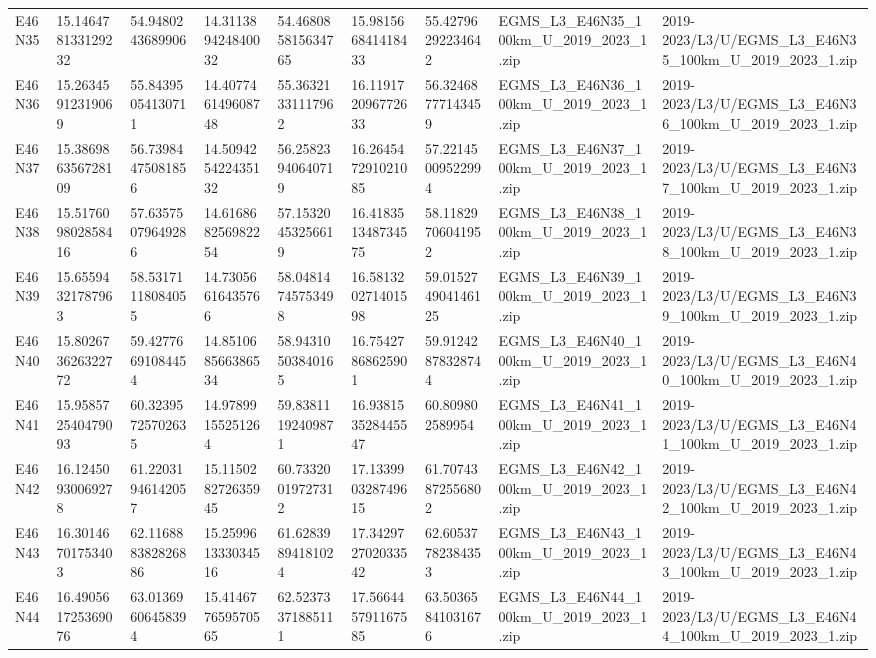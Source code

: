 \begin{landscape}
\begin{longtable}{lllllllll}
E46N35 & 15.146478133129232 & 54.9480243689906 & 14.311389424840032 & 54.468085815634765 & 15.981566841418433 & 55.42796292234642 & EGMS\_L3\_E46N35\_100km\_U\_2019\_2023\_1.zip & 2019-2023/L3/U/EGMS\_L3\_E46N35\_100km\_U\_2019\_2023\_1.zip \\
E46N36 & 15.26345912319069 & 55.84395054130711 & 14.407746149608748 & 55.36321331117962 & 16.119172096772633 & 56.32468777143459 & EGMS\_L3\_E46N36\_100km\_U\_2019\_2023\_1.zip & 2019-2023/L3/U/EGMS\_L3\_E46N36\_100km\_U\_2019\_2023\_1.zip \\
E46N37 & 15.386986356728109 & 56.73984475081856 & 14.509425422435132 & 56.25823940640719 & 16.264547291021085 & 57.22145009522994 & EGMS\_L3\_E46N37\_100km\_U\_2019\_2023\_1.zip & 2019-2023/L3/U/EGMS\_L3\_E46N37\_100km\_U\_2019\_2023\_1.zip \\
E46N38 & 15.517609802858416 & 57.63575079649286 & 14.616868256982254 & 57.15320453256619 & 16.418351348734575 & 58.11829706041952 & EGMS\_L3\_E46N38\_100km\_U\_2019\_2023\_1.zip & 2019-2023/L3/U/EGMS\_L3\_E46N38\_100km\_U\_2019\_2023\_1.zip \\
E46N39 & 15.65594321787963 & 58.53171118084055 & 14.73056616435766 & 58.04814745753498 & 16.581320271401598 & 59.015274904146125 & EGMS\_L3\_E46N39\_100km\_U\_2019\_2023\_1.zip & 2019-2023/L3/U/EGMS\_L3\_E46N39\_100km\_U\_2019\_2023\_1.zip \\
E46N40 & 15.802673626322772 & 59.42776691084454 & 14.851068566386534 & 58.94310503840165 & 16.75427868625901 & 59.91242878328744 & EGMS\_L3\_E46N40\_100km\_U\_2019\_2023\_1.zip & 2019-2023/L3/U/EGMS\_L3\_E46N40\_100km\_U\_2019\_2023\_1.zip \\
E46N41 & 15.958572540479093 & 60.32395725702635 & 14.97899155251264 & 59.83811192409871 & 16.938153528445547 & 60.809802589954 & EGMS\_L3\_E46N41\_100km\_U\_2019\_2023\_1.zip & 2019-2023/L3/U/EGMS\_L3\_E46N41\_100km\_U\_2019\_2023\_1.zip \\
E46N42 & 16.12450930069278 & 61.22031946142057 & 15.115028272635945 & 60.73320019727312 & 17.133990328749615 & 61.70743872556802 & EGMS\_L3\_E46N42\_100km\_U\_2019\_2023\_1.zip & 2019-2023/L3/U/EGMS\_L3\_E46N42\_100km\_U\_2019\_2023\_1.zip \\
E46N43 & 16.30146701753403 & 62.116888382826886 & 15.259961333034516 & 61.62839894181024 & 17.342972702033542 & 62.60537782384353 & EGMS\_L3\_E46N43\_100km\_U\_2019\_2023\_1.zip & 2019-2023/L3/U/EGMS\_L3\_E46N43\_100km\_U\_2019\_2023\_1.zip \\
E46N44 & 16.490561725369076 & 63.01369606458394 & 15.414677659570565 & 62.52373371885111 & 17.566445791167585 & 63.50365841031676 & EGMS\_L3\_E46N44\_100km\_U\_2019\_2023\_1.zip & 2019-2023/L3/U/EGMS\_L3\_E46N44\_100km\_U\_2019\_2023\_1.zip \\

\end{longtable}
\end{landscape}
